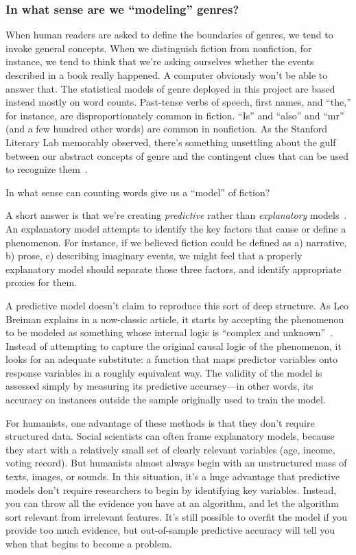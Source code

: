 \documentclass[paper=a4, fontsize=12pt]{scrartcl}
\numberwithin{equation}{section}		%
\numberwithin{figure}{section}			%
\numberwithin{table}{section}				%
\begin{document}
\subsubsection{In what sense are we ``modeling'' genres?}

When human readers are asked to define the boundaries of genres, we tend to invoke general concepts. When we distinguish fiction from nonfiction, for instance, we tend to think that we're asking ourselves whether the events described in a book really happened. A computer obviously won't be able to answer that. The statistical models of genre deployed in this project are based instead mostly on word counts. Past-tense verbs of speech, first names, and ``the,'' for instance, are disproportionately common in fiction. ``Is'' and ``also'' and ``mr'' (and a few hundred other words) are common in nonfiction. As the Stanford Literary Lab memorably observed, there's something unsettling about the gulf between our abstract concepts of genre and the contingent clues that can be used to recognize them~\cite{litlab:quantitative-formalism}.

In what sense can counting words give us a ``model'' of fiction?

A short answer is that we're creating \textit{predictive} rather than \textit{explanatory} models~\cite{shmueli:explain}. An explanatory model attempts to identify the key factors that cause or define a phenomenon. For instance, if we believed fiction could be defined as a) narrative, b) prose, c) describing imaginary events, we might feel that a properly explanatory model should separate those three factors, and identify appropriate proxies for them.

A predictive model doesn't claim to reproduce this sort of deep structure. As Leo Breiman explains in a now-classic article, it starts by accepting the phenomenon to be modeled as something whose internal logic is ``complex and unknown''~\cite{breiman:modeling}. Instead of attempting to capture the original causal logic of the phenomenon, it looks for an adequate substitute: a function that maps predictor variables onto response variables in a roughly equivalent way. The validity of the model is assessed simply by measuring its predictive accuracy---in other words, its accuracy on instances outside the sample originally used to train the model.

For humanists, one advantage of these methods is that they don't require structured data. Social scientists can often frame explanatory models, because they start with a relatively small set of clearly relevant variables (age, income, voting record). But humanists almost always begin with an unstructured mass of texts, images, or sounds. In this situation, it's a huge advantage that predictive models don't require researchers to begin by identifying key variables. Instead, you can throw all the evidence you have at an algorithm, and let the algorithm sort relevant from irrelevant features. It's still possible to overfit the model if you provide too much evidence, but out-of-sample predictive accuracy will tell you when that begins to become a problem.
\end{document}
